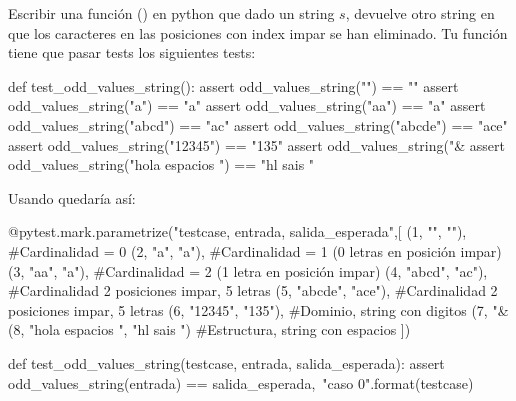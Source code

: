 \begin{ejercicio}
Escribir una función () en python que dado un string $s$, devuelve otro string en que los caracteres en las posiciones con index impar se han eliminado. Tu función tiene que pasar tests los siguientes tests:


\begin{small}
\begin{python}
def test_odd_values_string():
    assert odd_values_string("") == ""
    assert odd_values_string("a") == "a"
    assert odd_values_string("aa") == "a"
    assert odd_values_string("abcd") == "ac"
    assert odd_values_string("abcde") == "ace"
    assert odd_values_string("12345") == "135"
    assert odd_values_string("&%
    assert odd_values_string("hola espacios  ") == "hl sais "
\end{python}
\end{small}   

Usando  quedaría así:

\begin{small}
\begin{python}
@pytest.mark.parametrize("testcase, entrada, salida_esperada",[
(1, "", ""),                       #Cardinalidad = 0
(2, "a", "a"),                     #Cardinalidad = 1 (0 letras en posición impar)
(3, "aa", "a"),                    #Cardinalidad = 2 (1 letra en posición impar)
(4, "abcd", "ac"),                 #Cardinalidad 2 posiciones impar, 5 letras
(5, "abcde", "ace"),               #Cardinalidad 2 posiciones impar, 5 letras
(6, "12345", "135"),               #Dominio, string con digitos
(7, "&%
(8, "hola espacios  ", "hl sais ") #Estructura, string con espacios
])

def test_odd_values_string(testcase, entrada, salida_esperada):
    assert odd_values_string(entrada) == salida_esperada,\
           "caso {0}".format(testcase)
\end{python}
\end{small}

\end{ejercicio}

